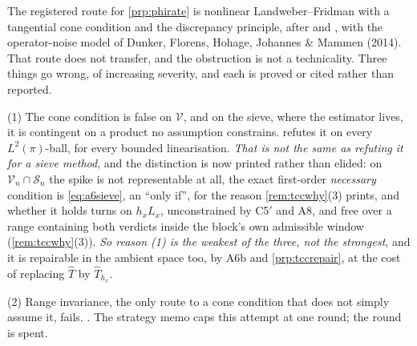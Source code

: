 \begin{remark}\label{rem:lfnonlinear}
The registered route for \cref{prp:phirate} is nonlinear Landweber--Fridman with a tangential cone
condition and the discrepancy principle, after \citet{hanke1995} and \citet[Ch.~11]{engl2000}, with the
operator-noise model of Dunker, Florens, Hohage, Johannes \& Mammen (2014). That route does not
transfer, and the obstruction is not a technicality. Three things go wrong, of increasing severity,
and each is proved or cited rather than reported.

(1) The cone condition is false on $\mathcal V$, and on the sieve, where the estimator lives,
it is contingent on a product no assumption constrains.  refutes it on every
$L^{2}(\pi)$-ball, for every bounded linearisation. \emph{That is not the same as refuting it for a
sieve method}, and the distinction is now printed rather than elided: on $\mathcal V_n\cap\mathcal S_n$
the spike is not representable at all, the exact first-order \emph{necessary} condition is
\eqref{eq:a6sieve}, an ``only if'', for the reason \cref{rem:tccwhy}(3) prints, and
whether it holds turns on $h_xL_x$, unconstrained by C5$'$ and A8, and free over a range containing
both verdicts inside the block's own admissible window (\cref{rem:tccwhy}(3)). \emph{So reason (1) is
the weakest of the three, not the strongest}, and it is repairable in the ambient space too, by A6b and
\cref{prp:tccrepair}, at the cost of replacing $\hat T$ by $\hat T_{h_x}$.

(2) Range invariance, the only route to a cone condition that does not simply assume it, fails.
. The strategy memo caps this attempt at one round; the round is spent.


\end{remark}
